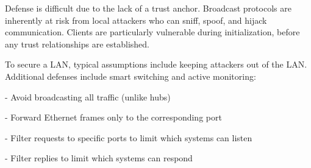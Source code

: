 Defense is difficult due to the lack of a trust anchor. Broadcast protocols are inherently at risk from local attackers who can sniff, spoof, and hijack communication. Clients are particularly vulnerable during initialization, before any trust relationships are established.  

To secure a LAN, typical assumptions include keeping attackers out of the LAN. Additional defenses include smart switching and active monitoring:

- Avoid broadcasting all traffic (unlike hubs)  

- Forward Ethernet frames only to the corresponding port  

- Filter requests to specific ports to limit which systems can listen  

- Filter replies to limit which systems can respond  
